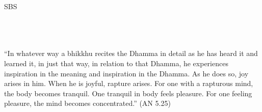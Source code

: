 \cleartorecto
\thispagestyle{empty}
\vspace*{3em}

{\centering

  \settowidth{\titleLength}{%
    {\Large\chapterTitleFont\textsc{\MakeUppercase{{\thetitle}}}}%
  }

  {\Huge\fontsize{64}{16}\sbsFont SBS}\\[1.0\baselineskip]%

  {\Huge\chapterTitleFont\textsc{{\thetitle\linebreak}}}\\[0.2\baselineskip]

  \\[1.4\baselineskip]

  {\Large\scshape \thesubtitle}\\[2.5\baselineskip]


  {``\quoteTitle In whatever way a bhikkhu recites the Dhamma in detail as he has heard it and learned it, in just that way, in relation to that Dhamma, he experiences inspiration in the meaning and inspiration in the Dhamma. As he does so, joy arises in him. When he is joyful, rapture arises. For one with a rapturous mind, the body becomes tranquil. One tranquil in body feels pleasure. For one feeling pleasure, the mind becomes concentrated.'' (AN 5.25)}\\[1.4\baselineskip]
}
